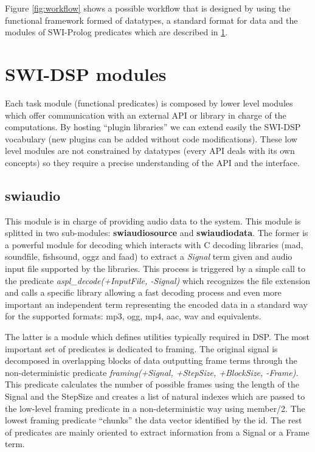 \documentclass[runningheads]{llncs}
\begin{document}
Figure \ref{fig:workflow} shows a possible workflow that is designed by using the functional framework formed of datatypes, a standard format for data and the modules of SWI-Prolog predicates which are described in \ref{sec:modules}.

\section{SWI-DSP modules}\label{sec:modules}

Each task module (functional predicates) is composed by lower level modules which offer communication with an external API or library in charge of the computations. By hosting ``plugin libraries'' we can extend easily the SWI-DSP vocabulary (new plugins can be added without code modifications). These low level modules are not constrained by datatypes (every API deals with its own concepts) so they require a precise understanding of the API and the interface.

\subsection{swiaudio}\label{subsec:swiaudio}

This module is in charge of providing audio data to the system. This module is splitted in two sub-modules: \textbf{swiaudiosource} and \textbf{swiaudiodata}. The former is a powerful module for decoding which interacts with C decoding libraries (mad, soundfile, fishsound, oggz and faad) to extract a \textit{Signal} term given and audio input file supported by the libraries. This process is triggered by a simple call to the predicate \textit{aspl\_decode(+InputFile, -Signal)} which recognizes the file extension and calls a specific library allowing a fast decoding process and even more important an independent term representing the encoded data in a standard way for the supported formats: mp3, ogg, mp4, aac, wav and equivalents.

The latter is a module which defines utilities typically required in DSP. The most important set of predicates is dedicated to framing. The original signal is decomposed in overlapping blocks of data outputting frame terms through the non-deterministic predicate \textit{framing(+Signal, +StepSize, +BlockSize, -Frame)}. This predicate calculates the number of possible frames using the length of the Signal and the StepSize and creates a list of natural indexes which are passed to the low-level framing predicate in a non-deterministic way using member/2. The lowest framing predicate ``chunks'' the data vector identified by the id. The rest of predicates are mainly oriented to extract information from a Signal or a Frame term.
\end{document}
